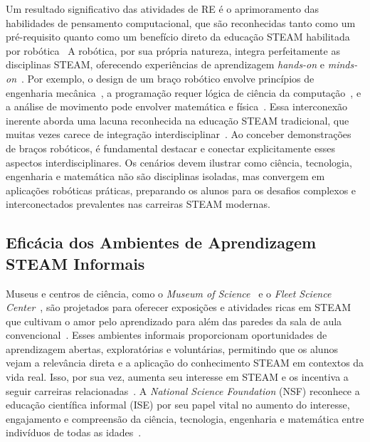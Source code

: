 \documentclass[%
  a4paper,%
  12pt,%
  fleqn,%
  english,%
  brazilian,%
]{article}
\begin{document}
Um resultado significativo das atividades de RE é o aprimoramento das habilidades de pensamento computacional, que são reconhecidas tanto como um pré-requisito quanto como um benefício direto da educação STEAM habilitada por robótica~\cite{rahman2024DigitalK12HRI} A robótica, por sua própria natureza, integra perfeitamente as disciplinas STEAM, oferecendo experiências de aprendizagem \emph{hands-on} e \emph{minds-on}~\cite{cheung2024SummerLibraries}. Por exemplo, o design de um braço robótico envolve princípios de engenharia mecânica~\cite{acebottImportanceRobotics2025}, a programação requer lógica de ciência da computação~\cite{whalesbotRevolutionizingSTEM2025}, e a análise de movimento pode envolver matemática e física~\cite{acebottImportanceRobotics2025}. Essa interconexão inerente aborda uma lacuna reconhecida na educação STEAM tradicional, que muitas vezes carece de integração interdisciplinar~\cite{lim2024IntegratedSTEMRobotics}. Ao conceber demonstrações de braços robóticos, é fundamental destacar e conectar explicitamente esses aspectos interdisciplinares. Os cenários devem ilustrar como ciência, tecnologia, engenharia e matemática não são disciplinas isoladas, mas convergem em aplicações robóticas práticas, preparando os alunos para os desafios complexos e interconectados prevalentes nas carreiras STEAM modernas.

\subsection{Eficácia dos Ambientes de Aprendizagem STEAM Informais}
\label{sec:ambientes_informais_eficacia}
Museus e centros de ciência, como o \textit{Museum of Science}~\cite{mosTeachingSTEM2025} e o \textit{Fleet Science Center}~\cite{fleetScienceCenter2025}, são projetados para oferecer exposições e atividades ricas em STEAM que cultivam o amor pelo aprendizado para além das paredes da sala de aula convencional~\cite{mosTeachingSTEM2025}. Esses ambientes informais proporcionam oportunidades de aprendizagem abertas, exploratórias e voluntárias, permitindo que os alunos vejam a relevância direta e a aplicação do conhecimento STEAM em contextos da vida real. Isso, por sua vez, aumenta seu interesse em STEAM e os incentiva a seguir carreiras relacionadas~\cite{ross2024BeyondExhibits}. A \textit{National Science Foundation} (NSF) reconhece a educação científica informal (ISE) por seu papel vital no aumento do interesse, engajamento e compreensão da ciência, tecnologia, engenharia e matemática entre indivíduos de todas as idades~\cite{informalscienceFramework2008}.
\end{document}
